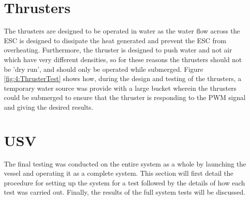 \section{Thrusters}
The thrusters are designed to be operated in water as the water flow across the ESC is designed to dissipate the heat generated and prevent the ESC from overheating. Furthermore, the thruster is designed to push water and not air which have very different densities, so for these reasons the thrusters should not be 'dry run', and should only be operated while submerged. Figure \ref{fig:4:ThrusterTest} shows how, during the design and testing of the thrusters, a temporary water source was provide with a large bucket wherein the thrusters could be submerged to ensure that the thruster is responding to the PWM signal and giving the desired results.

\section{USV}
The final testing was conducted on the entire system as a whole by launching the vessel and operating it as a complete system. This section will first detail the procedure for setting up the system for a test followed by the details of how each test was carried out. Finally, the results of the full system tests will be discussed. 
